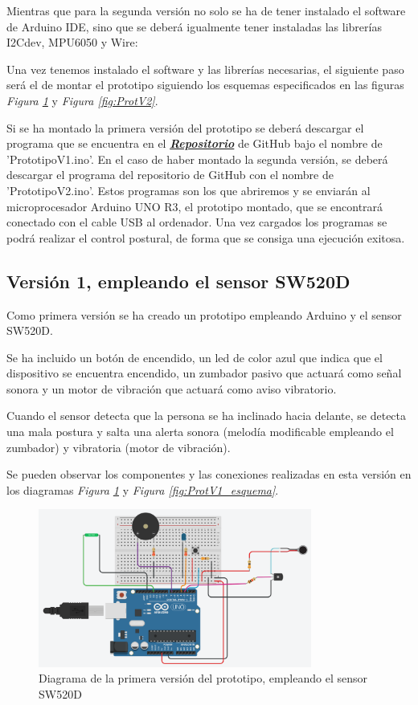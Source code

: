 Mientras que para la segunda versión no solo se ha de tener instalado el software de Arduino IDE, sino que se deberá igualmente tener instaladas las librerías I2Cdev\cite{LibI2Cdev}, MPU6050\cite{LibMPU6050} y Wire\cite{LibWire}: 

Una vez tenemos instalado el software y las librerías necesarias, el siguiente paso será el de montar el prototipo siguiendo los esquemas especificados en las figuras \textit{Figura \ref{fig:ProtV1}} y \textit{Figura \ref{fig:ProtV2}}.


Si se ha montado la primera versión del prototipo se deberá descargar el programa que se encuentra en el \href{https://github.com/NaiaraGadea/TFG_DispositivoDeControlPostural}{\textbf{\textit{Repositorio}}} de GitHub\cite{GitHub} bajo el nombre de 'PrototipoV1.ino'. En el caso de haber montado la segunda versión, se deberá descargar el programa del repositorio de GitHub\cite{GitHub} con el nombre de 'PrototipoV2.ino'. Estos programas son los que abriremos y se enviarán al microprocesador Arduino UNO R3\cite{Arduino2}, el prototipo montado, que se encontrará conectado con el cable USB al ordenador. Una vez cargados los programas se podrá realizar el control postural, de forma que se consiga una ejecución exitosa.


\subsection{Versión 1, empleando el sensor SW520D}
Como primera versión se ha creado un prototipo empleando Arduino\cite{Arduino1} y el sensor SW520D\cite{SW520D_1}.

Se ha incluido un botón de encendido, un led de color azul que indica que el dispositivo se encuentra encendido, un zumbador pasivo que actuará como señal sonora y un motor de vibración que actuará como aviso vibratorio.

Cuando el sensor detecta que la persona se ha inclinado hacia delante, se detecta una mala postura y salta una alerta sonora (melodía modificable empleando el zumbador) y vibratoria (motor de vibración).

Se pueden observar los componentes y las conexiones realizadas en esta versión en los diagramas \textit{Figura \ref{fig:ProtV1}} y \textit{Figura \ref{fig:ProtV1_esquema}}. 

\begin{figure}[h!]
    \centering
    \includegraphics[width=0.8\textwidth]{img/PrototipoV1_Tilt.png}
    \caption{Diagrama de la primera versión del prototipo, empleando el sensor SW520D}
    \label{fig:ProtV1}
\end{figure}

